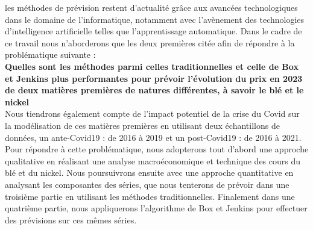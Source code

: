 les méthodes de prévision restent d'actualité grâce aux avancées technologiques dans le domaine de l'informatique, notamment avec l'avènement des technologies 
d'intelligence artificielle telles que l'apprentissage automatique. Dans le cadre de ce travail nous n'aborderons que les deux premières citée afin de répondre à la
problématique suivante : \\[5pt]
\textbf{Quelles sont les méthodes parmi celles traditionnelles et celle de Box et Jenkins plus performantes pour prévoir l'évolution du prix en 2023 de deux matières premières de natures différentes, à savoir le blé et le nickel}\\[5pt]
Nous tiendrons également compte de l'impact potentiel de la crise du Covid sur la modélisation de ces matières premières en utilisant deux échantillons de données, un 
ante-Covid19 : de 2016 à 2019 et un post-Covid19 : de 2016 à 2021.\\
Pour répondre à cette problématique, nous adopterons tout d'abord une approche qualitative en réalisant une analyse macroéconomique et technique des cours du blé et du 
nickel. Nous poursuivrons ensuite avec une approche quantitative en analysant les composantes des séries, que nous tenterons de prévoir dans une troisième partie en 
utilisant les méthodes traditionnelles. Finalement dans une quatrième partie, nous appliquerons l'algorithme de Box et Jenkins pour effectuer des prévisions sur ces mêmes 
séries.